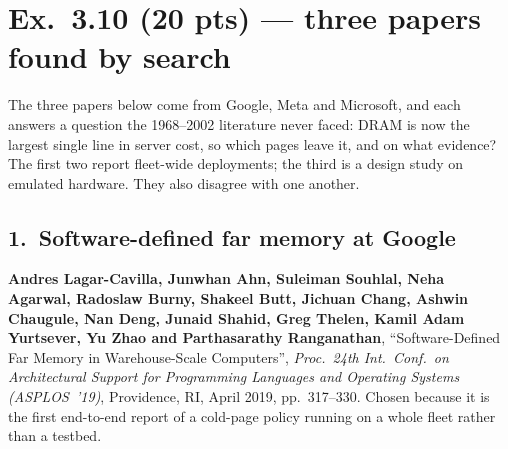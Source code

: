 \section*{Ex.~3.10 \quad (20 pts) --- three papers found by search}

The three papers below come from Google, Meta and Microsoft, and each answers a question
the 1968--2002 literature never faced: DRAM is now the largest single line in server
cost, so which pages leave it, and on what evidence? The first two report fleet-wide deployments;
the third is a design study on emulated hardware. They also disagree with one another.

\subsection*{1.~Software-defined far memory at Google}

\noindent\textbf{Andres Lagar-Cavilla, Junwhan Ahn, Suleiman Souhlal, Neha Agarwal,
Radoslaw Burny, Shakeel Butt, Jichuan Chang, Ashwin Chaugule, Nan Deng, Junaid Shahid,
Greg Thelen, Kamil Adam Yurtsever, Yu Zhao and Parthasarathy Ranganathan},
``Software-Defined Far Memory in Warehouse-Scale Computers'', \emph{Proc.\ 24th Int.\
Conf.\ on Architectural Support for Programming Languages and Operating Systems
(ASPLOS~'19)}, Providence, RI, April 2019, pp.~317--330. Chosen because it is the first
end-to-end report of a cold-page policy running on a whole fleet rather than a testbed.

